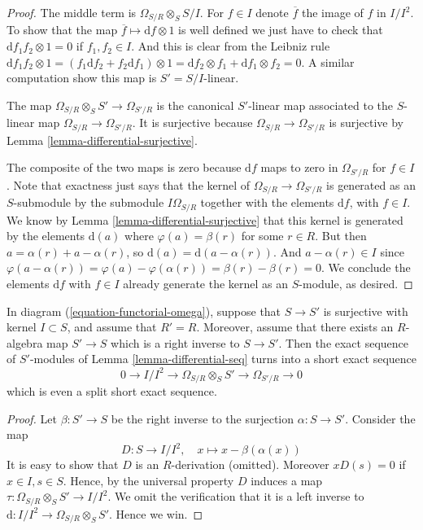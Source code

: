 \begin{proof}
The middle term is $\Omega_{S/R} \otimes_S S/I$.
For $f \in I$ denote $\overline{f}$ the image of $f$ in $I/I^2$.
To show that the map $\overline{f} \mapsto \text{d}f \otimes 1$
is well defined we just have to check that
$\text{d} f_1f_2 \otimes 1 = 0$ if $f_1, f_2 \in I$.
And this is clear from the Leibniz rule
$\text{d} f_1f_2 \otimes 1 = (f_1 \text{d}f_2 + f_2 \text{d} f_1 )\otimes 1 =
\text{d}f_2 \otimes f_1 + \text{d}f_1 \otimes f_2 = 0$.
A similar computation show this map is $S' = S/I$-linear.

\medskip\noindent
The map $\Omega_{S/R} \otimes_S S' \to \Omega_{S'/R}$
is the canonical $S'$-linear map associated to the
$S$-linear map $\Omega_{S/R} \to \Omega_{S'/R}$.
It is surjective because $\Omega_{S/R} \to \Omega_{S'/R}$
is surjective by Lemma \ref{lemma-differential-surjective}.

\medskip\noindent
The composite of the two maps is zero because
$\text{d}f$ maps to zero in $\Omega_{S'/R}$
for $f \in I$. Note that exactness just says that
the kernel of $\Omega_{S/R} \to \Omega_{S'/R}$
is generated as an $S$-submodule by the submodule $I\Omega_{S/R}$ together
with the elements $\text{d}f$, with $f \in I$. We know by
Lemma \ref{lemma-differential-surjective}
that this kernel is generated by the elements $\text{d}(a)$
where $\varphi(a) = \beta(r)$ for some $r \in R$.
But then $a = \alpha(r) + a - \alpha(r)$, so
$\text{d}(a) = \text{d}(a - \alpha(r))$. And
$a - \alpha(r) \in I$ since $\varphi(a - \alpha(r)) =
\varphi(a) - \varphi(\alpha(r)) = \beta(r) - \beta(r) = 0$.
We conclude the elements $\text{d}f$ with $f \in I$ already
generate the kernel as an $S$-module, as desired.
\end{proof}

\begin{lemma}
\label{lemma-differential-seq-split}
In diagram (\ref{equation-functorial-omega}),
suppose that $S \to S'$ is surjective with kernel $I \subset S$,
and assume that $R' = R$. Moreover, assume that there exists
an $R$-algebra map $S' \to S$ which is a right inverse to
$S \to S'$. Then the exact sequence of $S'$-modules
of Lemma \ref{lemma-differential-seq} turns into a short exact sequence
$$
0 \longrightarrow
I/I^2
\longrightarrow
\Omega_{S/R} \otimes_S S'
\longrightarrow
\Omega_{S'/R}
\longrightarrow
0
$$
which is even a split short exact sequence.
\end{lemma}

\begin{proof}
Let $\beta : S' \to S$ be the right inverse to the surjection
$\alpha : S \to S'$. Consider the map
$$
D : S \longrightarrow I/I^2,
\quad
x \longmapsto x - \beta(\alpha(x))
$$
It is easy to show that $D$ is an $R$-derivation (omitted).
Moreover $x D(s) = 0$ if $x \in I, s \in S$. Hence, by the universal property
$D$ induces a map $\tau : \Omega_{S/R} \otimes_S S' \to I/I^2$.
We omit the verification that it is a left inverse to
$\text{d} : I/I^2  \to \Omega_{S/R} \otimes_S S'$. Hence we win.
\end{proof}

